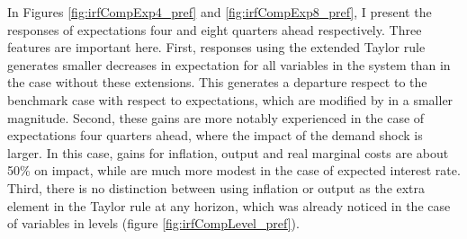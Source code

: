 \documentclass[12pt]{article}
\numberwithin{equation}{section}
\begin{document}
In Figures \ref{fig:irfCompExp4_pref} and \ref{fig:irfCompExp8_pref}, I present the responses of expectations four and eight quarters ahead respectively. Three features are important here. First, responses using the extended Taylor rule generates smaller decreases in expectation for all variables in the system than in the case without these extensions. This generates a departure respect to the benchmark case with respect to expectations, which are modified by in a smaller magnitude. Second, these gains are more notably experienced in the case of expectations four quarters ahead, where the impact of the demand shock is larger. In this case, gains for inflation, output and real marginal costs are about 50\% on impact, while are much more modest in the case of expected interest rate. Third, there is no distinction between using inflation or output as the extra element in the Taylor rule at any horizon, which was already noticed in the case of variables in levels (figure \ref{fig:irfCompLevel_pref}).

\end{document}
